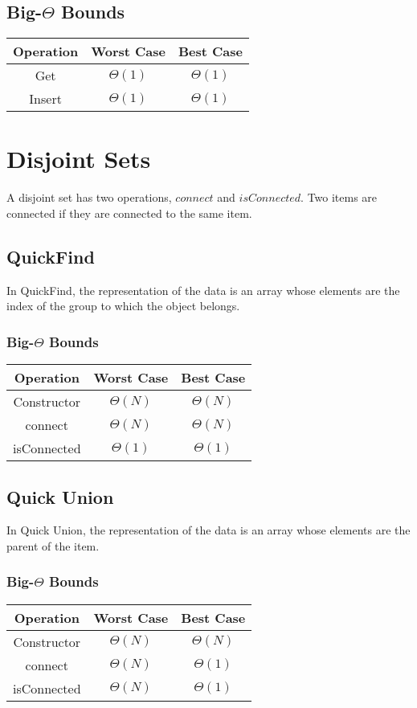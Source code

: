 \documentclass{article}
\begin{document}
\subsection{Big-$\Theta$ Bounds}
\begin{center}
    \begin{tabular}{ c | c | c }
     Operation & Worst Case & Best Case\\
     \hline
     Get & $\Theta(1)$ & $\Theta(1)$\\ 
     Insert & $\Theta(1)$ & $\Theta(1)$\\  
    \end{tabular}
\end{center}
\section{Disjoint Sets}
A disjoint set has two operations, $connect$ and $isConnected$. Two items are connected if they are connected to the same item.
\subsection{QuickFind}
In QuickFind, the representation of the data is an array whose elements are the index of the group to which the object belongs.
\subsubsection{Big-$\Theta$ Bounds}
\begin{center}
    \begin{tabular}{ c | c | c }
     Operation & Worst Case & Best Case\\
     \hline
     Constructor & $\Theta(N)$ & $\Theta(N)$\\ 
     connect & $\Theta(N)$ & $\Theta(N)$\\  
     isConnected & $\Theta(1)$ & $\Theta(1)$\\
    \end{tabular}
\end{center}
\subsection{Quick Union}
In Quick Union, the representation of the data is an array whose elements are the parent of the item.
\subsubsection{Big-$\Theta$ Bounds}
\begin{center}
    \begin{tabular}{ c | c | c }
     Operation & Worst Case & Best Case\\
     \hline
     Constructor & $\Theta(N)$ & $\Theta(N)$\\ 
     connect & $\Theta(N)$ & $\Theta(1)$\\  
     isConnected & $\Theta(N)$ & $\Theta(1)$\\
    \end{tabular}
\end{center}
\end{document}

